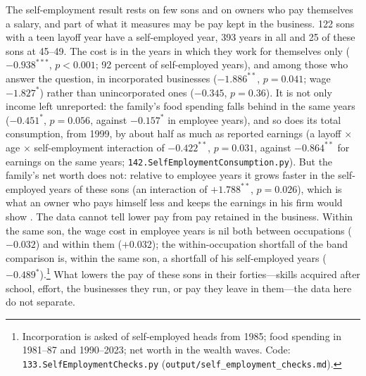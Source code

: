 The self-employment result rests on few sons and on owners who pay themselves a salary, and part of what it measures
may be pay kept in the business. 122 sons with a teen layoff year have a self-employed year, 393 years in all and 25
of these sons at 45--49. The cost is in the years in which they work for themselves only ($-0.938^{***}$, $p<0.001$;
92 percent of self-employed years), and among those who answer the question, in incorporated businesses
($-1.886^{**}$, $p = 0.041$; wage $-1.827^{*}$) rather than unincorporated ones ($-0.345$, $p = 0.36$). It is not only
income left unreported: the family's food spending falls behind in the same years ($-0.451^{*}$, $p = 0.056$, against
$-0.157^{*}$ in employee years), and so does its total consumption, from 1999, by about half as much as reported
earnings (a layoff $\times$ age $\times$ self-employment interaction of $-0.422^{**}$, $p = 0.031$, against
$-0.864^{**}$ for earnings on the same years; \texttt{142.SelfEmploymentConsumption.py}). But the family's net worth does not: relative to employee years it grows faster in the
self-employed years of these sons (an interaction of $+1.788^{**}$, $p = 0.026$), which is what an owner who pays
himself less and keeps the earnings in his firm would show \citep{smith2019capitalists}. The data cannot tell lower
pay from pay retained in the business. Within the same son, the wage cost in employee years is nil both between
occupations ($-0.032$) and within them ($+0.032$); the within-occupation shortfall of the band comparison is, within
the same son, a shortfall of his self-employed years ($-0.489^{*}$).\footnote{Incorporation is asked of self-employed
heads from 1985; food spending in 1981--87 and 1990--2023; net worth in the wealth waves. Code:
\texttt{133.SelfEmploymentChecks.py} (\texttt{output/self\_employment\_checks.md}).} What lowers the pay of these sons
in their forties---skills acquired after school, effort, the businesses they run, or pay they leave in them---the
data here do not separate.


